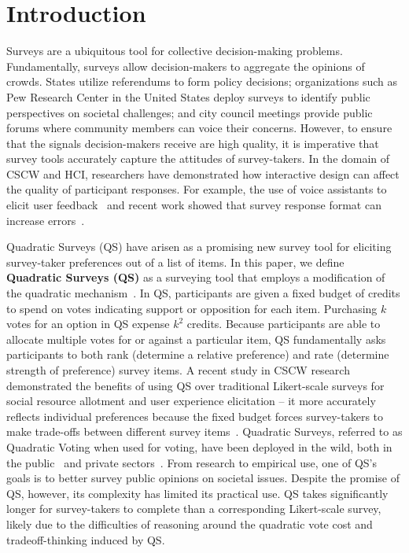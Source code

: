 \section{Introduction}

Surveys are a ubiquitous tool for collective decision-making problems. Fundamentally, surveys allow decision-makers to aggregate the opinions of crowds. States utilize referendums to form policy decisions; organizations such as Pew Research Center in the United States deploy surveys to identify public perspectives on societal challenges; and city council meetings provide public forums where community members can voice their concerns. However, to ensure that the signals decision-makers receive are high quality, it is imperative that survey tools accurately capture the attitudes of survey-takers. In the domain of CSCW and HCI, researchers have demonstrated how interactive design can affect the quality of participant responses. For example, the use of voice assistants to elicit user feedback~\cite{xiaoLetMeAsk2021} and recent work showed that survey response format can increase errors~\cite{pielotDidYouMisclick2024}.

Quadratic Surveys (QS) have arisen as a promising new survey tool for eliciting survey-taker preferences out of a list of items. In this paper, we define \textbf{Quadratic Surveys (QS)} as a surveying tool that employs a modification of the quadratic mechanism~\cite{grovesOptimalAllocationPublic1977}. In QS, participants are given a fixed budget of credits to spend on votes indicating support or opposition for each item. Purchasing $k$ votes for an option in QS expense $k^2$ credits. Because participants are able to allocate multiple votes for or against a particular item, QS fundamentally asks participants to both rank (determine a relative preference) and rate (determine strength of preference) survey items. A recent study in CSCW research demonstrated the benefits of using QS over traditional Likert-scale surveys for social resource allotment and user experience elicitation -- it more accurately reflects individual preferences because the fixed budget forces survey-takers to make trade-offs between different survey items~\cite{chengCanShowWhat2021}. Quadratic Surveys, referred to as Quadratic Voting when used for voting, have been deployed in the wild, both in the public~\cite{rogersColoradoTriedNew2019, teamTaiwanDigitalMinister} and private sectors~\cite{Gov4gitDecentralizedPlatform2023}. From research to empirical use, one of QS's goals is to better survey public opinions on societal issues. Despite the promise of QS, however, its complexity has limited its practical use. QS takes significantly longer for survey-takers to complete than a corresponding Likert-scale survey, likely due to the difficulties of reasoning around the quadratic vote cost and tradeoff-thinking induced by QS.



